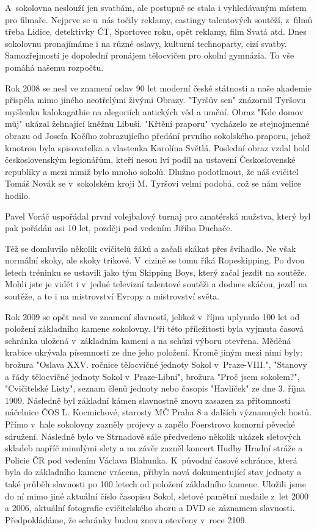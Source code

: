 \documentclass[a5paper, 12pt, twoside]{article}
\begin{document}
A~sokolovna neslouží jen svatbám, ale postupně se stala i vyhledávaným
místem pro filmaře. Nejprve se u~nás točily reklamy, castingy
talentových soutěží, z~filmů třeba Lidice, detektivky ČT, Sportovec
roku, opět reklamy, film Svatá atd. Dnes sokolovnu pronajímáme i na
různé oslavy, kulturní technoparty, cizí svatby. Samozřejmostí je
dopolední pronájem tělocvičen pro okolní gymnázia. To vše pomáhá našemu
rozpočtu.

Rok 2008 se nesl ve znamení oslav 90 let moderní české státnosti a naše
akademie přispěla mimo jiného neotřelými živými Obrazy. "Tyršův sen"
znázornil Tyršovu myšlenku kalokagathie na alegoriích antických věd a
umění. Obraz "Kde domov můj" ukázal žehnající kněžnu Libuši. "Křtění
praporu" vycházelo ze stejnojmenné obrazu od Josefa Kočího
zobrazujícího předání prvního sokolského praporu, jehož kmotrou byla
spisovatelka a vlastenka Karolína Světlá. Poslední obraz vzdal hold
československým legionářům, kteří nesou lví podíl na ustavení
Československé republiky a mezi nimiž bylo mnoho sokolů. Dlužno
podotknout, že náš cvičitel Tomáš Novák se v~sokolském kroji M. Tyršovi
velmi podobá, což se nám velice hodilo.

Pavel Voráč uspořádal první volejbalový turnaj pro amatérská mužstva,
který byl pak pořádán asi 10 let, později pod vedením Jiřího Duchače.

Též se domluvilo několik cvičitelů žáků a začali skákat přes švihadlo.
Ne však normální skoky, ale skoky trikové. V~cizině se tomu říká
Ropeskipping. Po dvou letech tréninku se ustavili jako tým Skipping
Boys, který začal jezdit na soutěže. Mohli jste je vidět i v~jedné
televizní talentové soutěži a dodnes skáčou, jezdí na soutěže, a to i na
mistrovství Evropy a mistrovství světa.

Rok 2009 se opět nesl ve znamení slavností, jelikož v~říjnu uplynulo 100
let od položení základního kamene sokolovny. Při této příležitosti byla
vyjmuta časová schránka uložená v~základním kameni a na schůzi výboru
otevřena. Měděná krabice ukrývala písemnosti ze dne jeho položení. Kromě
jiným mezi nimi byly: brožura "Oslava XXV. ročnice tělocvičné jednoty
Sokol v~Praze-VIII.", "Stanovy a řády tělocvičné jednoty Sokol
v~Praze-Libni", brožura "Proč jsem sokolem?", "Cvičitelské Listy",
seznam členů jednoty nebo časopis "Havlíček" ze dne 3. října 1909.
Následně byl základní kámen slavnostně znovu zasazen za přítomnosti
náčelnice ČOS L. Kocmichové, starosty MČ Praha 8 a dalších významných
hostů. Přímo v~hale sokolovny zazněly projevy a zapělo Foerstrovo
komorní pěvecké sdružení. Následně bylo ve Strnadově sále předvedeno
několik ukázek sletových skladeb napříč minulými slety a na závěr zazněl
koncert Hudby Hradní stráže a Policie ČR pod vedením Václava Blahunka.
K~původní časové schránce, která byla do základního kamene vrácena,
přibyla nová dokumentující stav jednoty a také průběh slavnosti po 100
letech od položení základního kamene. Uložili jsme do ní mimo jiné
aktuální číslo časopisu Sokol, sletové pamětní medaile z~let 2000 a
2006, aktuální fotografie cvičitelského sboru a DVD se záznamem
slavnosti. Předpokládáme, že schránky budou znovu otevřeny v~roce 2109.
\end{document}
